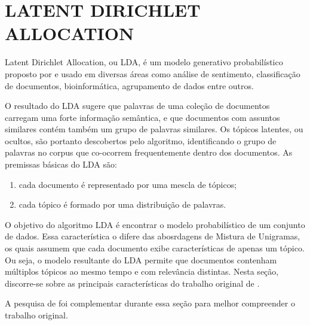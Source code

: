 \documentclass[12pt,a4paper]{article}
\begin{document}



\section{LATENT DIRICHLET ALLOCATION}
Latent Dirichlet Allocation, ou LDA, é um modelo generativo probabilístico proposto por  e usado em diversas áreas como análise de sentimento,
 classificação de documentos, bioinformática, agrupamento de dados entre outros. 
 
 O resultado do LDA sugere que palavras de uma coleção de documentos carregam uma forte informação semântica,
 e que documentos com assuntos similares contém também um grupo de palavras similares. Os tópicos latentes, ou ocultos,
 são portanto descobertos pelo algoritmo, identificando o grupo de palavras no corpus que co-ocorrem frequentemente dentro dos documentos. As premissas  básicas do LDA são:

\begin{enumerate}
  \item cada documento é representado por uma mescla de tópicos;
  \item cada tópico é formado por uma distribuição de palavras.
\end{enumerate}

O objetivo do algoritmo LDA é encontrar o modelo probabilístico de um conjunto de dados. Essa característica o difere das abosrdagens de Mistura de Unigramas, os quais assumem que cada documento exibe características de apenas um tópico. Ou seja, o modelo resultante do LDA  permite que documentos contenham múltiplos tópicos ao mesmo tempo e com relevância distintas. Nesta seção, discorre-se sobre as principais características do trabalho original de .
 
 A pesquisa de  foi complementar durante essa seção para melhor compreender o trabalho original.
\end{document}
